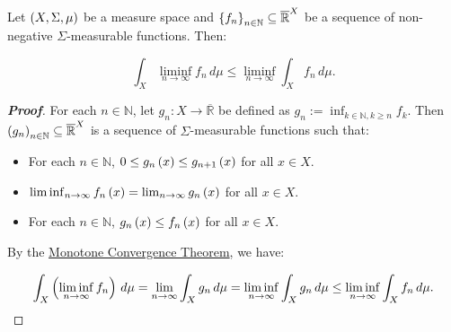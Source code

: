 \begin{theorem}
  Let $\left(X,\Sigma,\mu\right)$ be a measure space and $\left\{f_n\right\}_{n\in\mathbb{N}}\subseteq\overline{\mathbb{R}}^X$ be a sequence of non-negative $\Sigma$-measurable functions. Then:

  \begin{equation}
    \int_{X}{\liminf_{n\to\infty}{f_n}\,d\mu}\leq\liminf_{n\to\infty}{\int_{X}{f_n}\,d\mu}.
  \end{equation}
  \begin{proof}[\rm\textbf{Proof}]
    For each $n\in\mathbb{N}$, let $g_n:X\rightarrow\overline{\mathbb{R}}$ be defined as $g_n:=\inf_{k\in\mathbb{N},k\geq n}{f_k}$. Then $\left(g_n\right)_{n\in\mathbb{N}}\subseteq\overline{\mathbb{R}}^X$ is a sequence of $\Sigma$-measurable functions such that:

    \begin{itemize}
      \item For each $n\in\mathbb{N}$, $0\leq g_n\left(x\right)\leq g_{n+1}\left(x\right)$ for all $x\in X$.
      \item $\liminf_{n\to\infty}{f_n\left(x\right)}=\lim_{n\to\infty}{g_n\left(x\right)}$ for all $x\in X$.
      \item For each $n\in\mathbb{N}$, $g_n\left(x\right)\leq f_n\left(x\right)$ for all $x\in X$.
    \end{itemize}

    By the \hyperref[Monotone Convergence Theorem]{Monotone Convergence Theorem}, we have:

    \begin{equation}
      \int_{X}{\left(\liminf_{n\to\infty}{f_n}\right)\,d\mu}=\lim_{n\to\infty}{\int_{X}{g_n\,d\mu}}=\liminf_{n\to\infty}{\int_{X}{g_n\,d\mu}}\leq\liminf_{n\to\infty}{\int_{X}{f_n\,d\mu}}.
    \end{equation}
  \end{proof}
\end{theorem}

